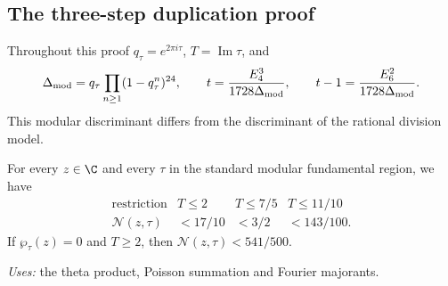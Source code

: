 \subsection{The three-step duplication proof}
Throughout this proof $q_\tau=e^{2\pi i\tau}$, $T=\operatorname{Im}\tau$, and
\[
\Delta_{\rm mod}=q_\tau\prod_{n\ge1}(1-q_\tau^n)^{24},\qquad
 t=\frac{E_4^3}{1728\Delta_{\rm mod}},\qquad
 t-1=\frac{E_6^2}{1728\Delta_{\rm mod}}.
\]
This modular discriminant differs from the discriminant of the rational division model.

\begin{proposition}\label{ari:C.8.1}
For every $z\in\C$ and every $\tau$ in the standard modular
fundamental region, we have
\[
 \begin{array}{c|ccc}
 \text{restriction}&T\le2&T\le7/5&T\le11/10\\ \hline
 \mathcal N(z,\tau)&<17/10&<3/2&<143/100.
 \end{array}
\]
If $\wp_\tau(z)=0$ and $T\ge2$, then $\mathcal N(z,\tau)<541/500$.
\end{proposition}
\noindent\textit{Uses:} the theta product, Poisson summation and Fourier majorants.\par
